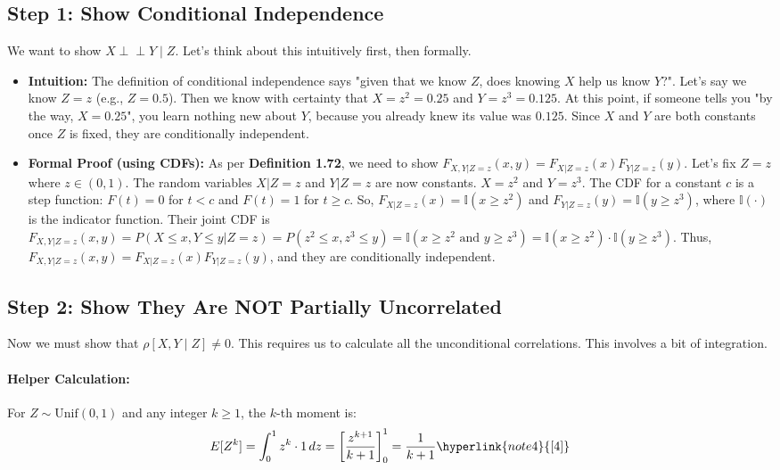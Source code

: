 \documentclass[11pt,a4paper]{article}
\begin{document}
\subsection{Step 1: Show Conditional Independence}
We want to show $X \perp\perp Y \mid Z$. Let's think about this intuitively first, then formally.
\begin{itemize}
    \item \textbf{Intuition:} The definition of conditional independence says "given that we know $Z$, does knowing $X$ help us know $Y$?". Let's say we know $Z=z$ (e.g., $Z=0.5$). Then we know with certainty that $X = z^2 = 0.25$ and $Y = z^3 = 0.125$. At this point, if someone tells you "by the way, $X=0.25$", you learn nothing new about $Y$, because you already knew its value was $0.125$. Since $X$ and $Y$ are both constants once $Z$ is fixed, they are conditionally independent.

    \item \textbf{Formal Proof (using CDFs):} As per \textbf{Definition 1.72}, we need to show $F_{X,Y|Z=z}(x,y) = F_{X|Z=z}(x) F_{Y|Z=z}(y)$.
    Let's fix $Z=z$ where $z \in (0,1)$. The random variables $X|Z=z$ and $Y|Z=z$ are now constants.
    $X = z^2$ and $Y = z^3$.
    The CDF for a constant $c$ is a step function: $F(t) = 0$ for $t < c$ and $F(t) = 1$ for $t \ge c$.
    So, $F_{X|Z=z}(x) = \mathbb{I}(x \ge z^2)$ and $F_{Y|Z=z}(y) = \mathbb{I}(y \ge z^3)$, where $\mathbb{I}(\cdot)$ is the indicator function.
    Their joint CDF is $F_{X,Y|Z=z}(x,y) = P(X \le x, Y \le y | Z=z) = P(z^2 \le x, z^3 \le y) = \mathbb{I}(x \ge z^2 \text{ and } y \ge z^3) = \mathbb{I}(x \ge z^2) \cdot \mathbb{I}(y \ge z^3)$.
    Thus, $F_{X,Y|Z=z}(x,y) = F_{X|Z=z}(x) F_{Y|Z=z}(y)$, and they are conditionally independent.
\end{itemize}

\subsection{Step 2: Show They Are NOT Partially Uncorrelated}
Now we must show that $\rho[X, Y \mid Z] \neq 0$. This requires us to calculate all the unconditional correlations. This involves a bit of integration.

\paragraph{Helper Calculation:} For $Z \sim \text{Unif}(0,1)$ and any integer $k \ge 1$, the $k$-th moment is:
\[ E[Z^k] = \int_0^1 z^k \cdot 1 \,dz = \left[\frac{z^{k+1}}{k+1}\right]_0^1 = \frac{1}{k+1} \hyperlink{note4}{[4]} \]
\end{document}
